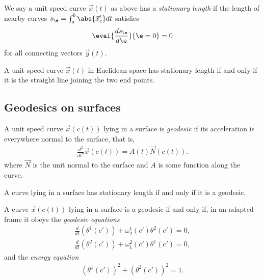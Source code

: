 \documentclass{article}
\begin{document}
\begin{definition}
    We say a unit speed curve $\vec x(t)$ as above has a \emph{stationary length} if 
    the length of nearby curves $s_\e = \int_a^b \abs{\vec x'_c} dt$ satisfies 
    \begin{align*}
        \eval{\frac{ds_\e}{d\e }}{\e=0}=0
    \end{align*}
    for all connecting vectors $\vec y(t)$.
\end{definition}

\begin{proposition}
    A unit speed curve $\vec x(t)$ in Euclidean space has stationary length if and only if 
    it is the straight line joining the two end points.
\end{proposition}

\subsection{Geodesics on surfaces}

\begin{definition}
    A unit speed curve $\vec x(c(t))$ lying in a surface is \emph{geodesic} if its acceleration
    is everywhere normal to the surface, that is, 
    \begin{align*}
        \frac{d^2}{dt^2}\vec x(c(t)) = A(t)\vec N(c(t)).
    \end{align*}
    where $\vec N$ is the unit normal to the surface and $A$ is some function along the curve.
\end{definition}

\begin{proposition}
    A curve lying in a surface has stationary length if and only if it is a geodesic.
\end{proposition}

\begin{proposition}
    A curve $\vec x(c(t))$ lying in a surface is a geodesic if and only if, in an adapted frame 
    it obeys the \emph{geodesic equations}
    \begin{align*}
        \frac{d}{dt}(\theta^1 (c')) + \omega_2^1(c')\theta^2(c') = 0,\\
        \frac{d}{dt}(\theta^2 (c')) + \omega_1^2(c')\theta^1(c') = 0,
    \end{align*}
    and the \emph{energy equation}
    \begin{align*}
        (\theta^1(c'))^2 + (\theta^2(c'))^2 = 1.
    \end{align*}
\end{proposition}
\end{document}
